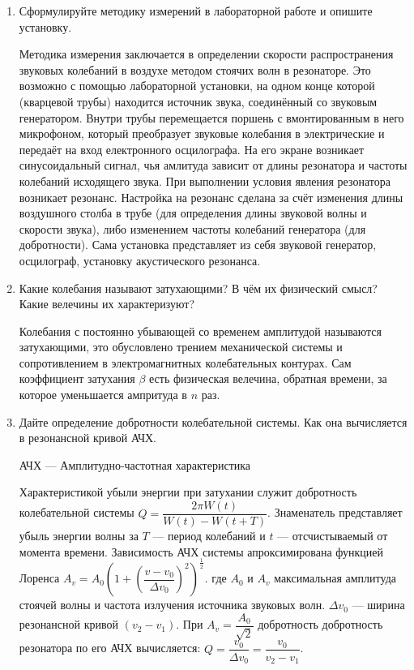 \documentclass[12pt,a4paper]{article}%
\begin{document}
\begin{enumerate}
	\item Сформулируйте методику измерений в лабораторной работе и опишите установку.
	
	Методика измерения заключается в определении скорости распространения звуковых колебаний в воздухе методом стоячих волн в резонаторе. Это возможно с помощью лабораторной установки, на одном конце которой (кварцевой трубы) находится источник звука, соединённый со звуковым генератором. Внутри трубы перемещается поршень с вмонтированным в него микрофоном, который преобразует звуковые колебания в электрические и передаёт на вход електронного осцилографа. На его экране возникает синусоидальный сигнал, чья амлитуда зависит от длины резонатора и частоты колебаний исходящего звука. При выполнении условия явления резонатора возникает резонанс. Настройка на резонанс сделана за счёт изменения длины воздушного столба в трубе (для определения длины звуковой волны и скорости звука), либо изменением частоты колебаний генератора (для добротности). Сама установка представляет из себя звуковой генератор, осцилограф, установку акустического резонанса.
	
	\item Какие колебания называют затухающими? В чём их физический смысл? Какие велечины их характеризуют?
	
	Колебания с постоянно убывающей со временем амплитудой называются затухающими, это обусловлено трением механической системы и сопротивлением в электромагнитных колебательных контурах. Сам коэффициент затухания $ \beta $ есть физическая велечина, обратная времени, за которое уменьшается ампритуда в $ n $ раз.
	
	\item Дайте определение добротности колебательной системы. Как она вычисляется в резонансной кривой АЧХ.
	
	АЧХ --- Амплитудно-частотная характеристика
	
	Характеристикой убыли энергии при затухании служит добротность колебательной системы $ Q = \dfrac{2 \pi W (t)}{W(t) - W(t+T)} $. Знаменатель представляет убыль энергии волны за $ T $ --- период колебаний и $ t $ --- отсчистываемый от момента времени. Зависимость АЧХ системы апроксимирована функцией Лоренса $ A_{v} = A_{0}(1+(\dfrac{v-v_{0}}{\Delta v_{0}})^{2})^{\dfrac{_1}{^2}} $. где $ A_{0} $ и $ A_{v} $ максимальная амплитуда стоячей волны и частота излучения источника звуковых волн. $ \Delta v_{0} $ --- ширина резонансной кривой
	$ (v_2 - v_1) $. При $ A_v = \dfrac{A_0}{\sqrt{2}} $ добротность добротность резонатора по его АЧХ вычисляется: $ Q = \dfrac{v_0}{\Delta v_0} = \dfrac{v_0}{v_2 - v_1} $.
	 

\end{enumerate}
\end{document}
